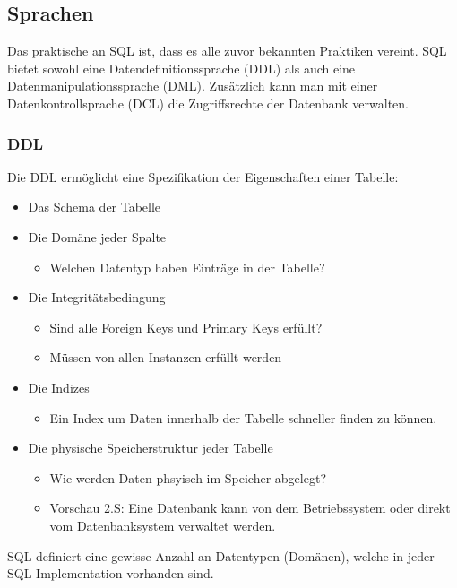 \documentclass{article}
\begin{document}
 	\subsection{Sprachen}
 	Das praktische an SQL ist, dass es alle zuvor bekannten Praktiken vereint. SQL bietet sowohl eine Datendefinitionssprache (DDL) als auch eine Datenmanipulationssprache (DML). Zusätzlich kann man mit einer Datenkontrollsprache (DCL) die Zugriffsrechte der Datenbank verwalten.
 	\subsubsection{DDL}
 	Die DDL ermöglicht eine Spezifikation der Eigenschaften einer Tabelle:
 	\begin{itemize}
 		\item{Das Schema der Tabelle}
 		\item{Die Domäne jeder Spalte}
 		\begin{itemize}
 			\item{Welchen Datentyp haben Einträge in der Tabelle?}
 		\end{itemize}
 		\item{Die Integritätsbedingung}
 		\begin{itemize}
 			\item{Sind alle Foreign Keys und Primary Keys erfüllt?}
 			\item{Müssen von allen Instanzen erfüllt werden}
 		\end{itemize}
 		\item{Die Indizes}
 		\begin{itemize}
 			\item{Ein Index um Daten innerhalb der Tabelle schneller finden zu können.}
 		\end{itemize}
 		\item{Die physische Speicherstruktur jeder Tabelle}
 		\begin{itemize}
 			\item{Wie werden Daten phsyisch im Speicher abgelegt?}
 			\item{Vorschau 2.S: Eine Datenbank kann von dem Betriebssystem oder direkt vom Datenbanksystem verwaltet werden.}
 		\end{itemize}
 	\end{itemize}
 	SQL definiert eine gewisse Anzahl an Datentypen (Domänen), welche in jeder SQL Implementation vorhanden sind.
\end{document}
